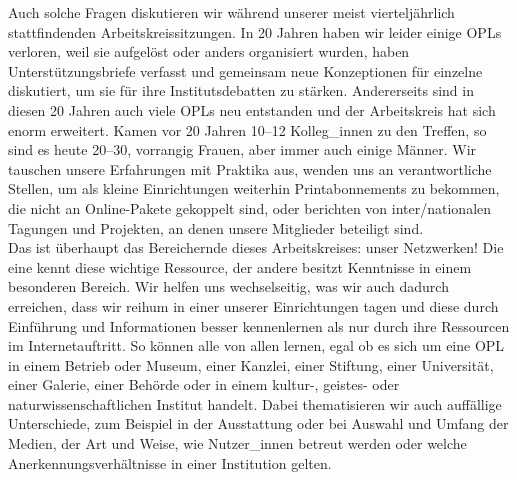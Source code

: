 \documentclass[a4paper,
fontsize=11pt,
oneside,
numbers=noperiodatend,
parskip=half-,
bibliography=totoc,
final
]{scrartcl}
\begin{document}
Auch solche Fragen diskutieren wir während unserer meist vierteljährlich
stattfindenden Arbeitskreissitzungen. In 20 Jahren haben wir leider
einige OPLs verloren, weil sie aufgelöst oder anders organisiert wurden,
haben Unterstützungsbriefe verfasst und gemeinsam neue Konzeptionen für
einzelne diskutiert, um sie für ihre Institutsdebatten zu stärken.
Andererseits sind in diesen 20 Jahren auch viele OPLs neu entstanden und
der Arbeitskreis hat sich enorm erweitert. Kamen vor 20 Jahren 10--12
Kolleg\_innen zu den Treffen, so sind es heute 20--30, vorrangig Frauen,
aber immer auch einige Männer. Wir tauschen unsere Erfahrungen mit
Praktika aus, wenden uns an verantwortliche Stellen, um als kleine
Einrichtungen weiterhin Printabonnements zu bekommen, die nicht an
Online-Pakete gekoppelt sind, oder berichten von inter/nationalen
Tagungen und Projekten, an denen unsere Mitglieder beteiligt sind.\\
Das ist überhaupt das Bereichernde dieses Arbeitskreises: unser
Netzwerken! Die eine kennt diese wichtige Ressource, der andere besitzt
Kenntnisse in einem besonderen Bereich. Wir helfen uns wechselseitig,
was wir auch dadurch erreichen, dass wir reihum in einer unserer
Einrichtungen tagen und diese durch Einführung und Informationen besser
kennenlernen als nur durch ihre Ressourcen im Internetauftritt. So
können alle von allen lernen, egal ob es sich um eine OPL in einem
Betrieb oder Museum, einer Kanzlei, einer Stiftung, einer Universität,
einer Galerie, einer Behörde oder in einem kultur-, geistes- oder
naturwissenschaftlichen Institut handelt. Dabei thematisieren wir auch
auffällige Unterschiede, zum Beispiel in der Ausstattung oder bei
Auswahl und Umfang der Medien, der Art und Weise, wie Nutzer\_innen
betreut werden oder welche Anerkennungsverhältnisse in einer Institution
gelten.
\end{document}
